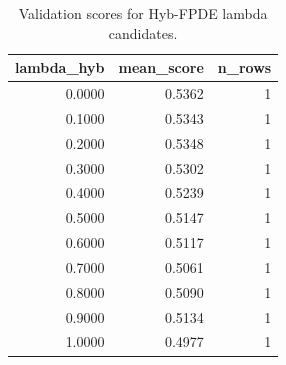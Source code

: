 \begin{table}[t]
\caption{Validation scores for Hyb-FPDE lambda candidates.}
\label{tab:lambda_distribution_computed}
\centering
\begin{tabular}{rrr}
\toprule
lambda\_hyb & mean\_score & n\_rows \\
\midrule
0.0000 & 0.5362 & 1 \\
0.1000 & 0.5343 & 1 \\
0.2000 & 0.5348 & 1 \\
0.3000 & 0.5302 & 1 \\
0.4000 & 0.5239 & 1 \\
0.5000 & 0.5147 & 1 \\
0.6000 & 0.5117 & 1 \\
0.7000 & 0.5061 & 1 \\
0.8000 & 0.5090 & 1 \\
0.9000 & 0.5134 & 1 \\
1.0000 & 0.4977 & 1 \\
\bottomrule
\end{tabular}

\end{table}
